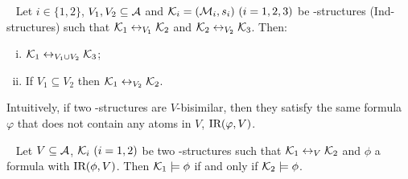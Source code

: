 \documentclass[letterpaper]{article}
\begin{document}
\begin{proposition}\label{div}~\cite{renyansfirstpaper}
Let $i\in \{1,2\}$, $V_1,V_2\subseteq\cal A$ 
and ${\cal K}_i=({\cal M}_i,s_i)~(i=1,2,3)$ be \MPK-structures (Ind-structures)
 such that
${\cal K}_1\leftrightarrow_{V_1}{\cal K}_2$ and ${\cal K}_2\leftrightarrow_{V_2}{\cal K}_3$.
 Then:
 \begin{enumerate}[(i)]
   \item ${\cal K}_1\leftrightarrow_{V_1\cup V_2}{\cal K}_3$;
   \item If $V_1 \subseteq V_2$ then ${\cal K}_1 \leftrightarrow_{V_2} {\cal K}_2$.
 \end{enumerate}
\end{proposition}

Intuitively, if two \MPK-structures are $V$-bisimilar, then they satisfy the same formula $\varphi$ that does not contain any atoms in $V$, \ie $\textrm{IR}(\varphi, V)$.
\begin{theorem}\label{thm:V-bisimulation:EQ}~\cite{renyansfirstpaper}
  Let $V\subseteq\cal A$, ${\cal K}_i~(i=1,2)$ be two \MPK-structures such that
  ${\cal K}_1\leftrightarrow_V{\cal K}_2$ and $\phi$ a formula with $\textrm{IR}(\phi,V)$. Then
  ${\cal K}_1\models\phi$ if and only if ${\cal K}_2\models\phi$.
\end{theorem}
\end{document}
